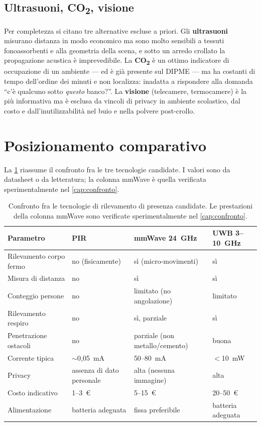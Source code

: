 \subsection{Ultrasuoni, CO\textsubscript{2}, visione}

Per completezza si citano tre alternative escluse a priori.
Gli \textbf{ultrasuoni} misurano distanza in modo economico ma sono molto
sensibili a tessuti fonoassorbenti e alla geometria della scena, e sotto un arredo
crollato la propagazione acustica è imprevedibile.
La \textbf{CO\textsubscript{2}} è un ottimo indicatore di occupazione di un
ambiente --- ed è già presente sul DIPME --- ma ha costanti di tempo dell'ordine
dei minuti e non localizza: inadatta a rispondere alla domanda ``c'è qualcuno
sotto \emph{questo} banco?''.
La \textbf{visione} (telecamere, termocamere) è la più informativa ma è esclusa da
vincoli di privacy in ambiente scolastico, dal costo e dall'inutilizzabilità nel
buio e nella polvere post-crollo.

\section{Posizionamento comparativo}
\label{sec:posizionamento}

La \cref{tab:comparativa} riassume il confronto fra le tre tecnologie candidate. I
valori sono da datasheet o da letteratura; la colonna mmWave è quella verificata
sperimentalmente nel \cref{cap:confronto}.

\begin{table}[htbp]
\centering
\caption{Confronto fra le tecnologie di rilevamento di presenza candidate. Le
prestazioni della colonna mmWave sono verificate sperimentalmente nel
\cref{cap:confronto}.}
\label{tab:comparativa}
\small
\begin{tabularx}{\linewidth}{@{}lXXX@{}}
\toprule
\textbf{Parametro} & \textbf{PIR} & \textbf{mmWave 24~GHz} & \textbf{UWB 3--10~GHz} \\
\midrule
Rilevamento corpo fermo & no (fisicamente) & sì (micro-movimenti) & sì \\
Misura di distanza & no & sì & sì \\
Conteggio persone & no & limitato (no angolazione) & limitato \\
Rilevamento respiro & no & sì, parziale & sì \\
Penetrazione ostacoli & no & parziale (non metallo/cemento) & buona \\
Corrente tipica & $\sim$0,05~mA & 50--80~mA & $<$10~mW \\
Privacy & assenza di dato personale & alta (nessuna immagine) & alta \\
Costo indicativo & 1--3~\euro & 5--15~\euro & 20--50~\euro \\
Alimentazione & batteria adeguata & fissa preferibile & batteria adeguata \\
\bottomrule
\end{tabularx}
\end{table}

